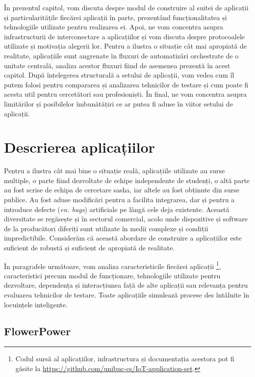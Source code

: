 În prezentul capitol, vom discuta despre modul de construire al suitei de aplicații și particularitățile fiecărei aplicații în parte, prezentând funcționalitatea și tehnologiile utilizate pentru realizarea ei. Apoi, ne vom concentra asupra infrastructurii de interconectare a aplicațiilor și vom discuta despre protocoalele utilizate și motivația alegerii lor. Pentru a ilustra o situație cât mai apropiată de realitate, aplicațiile sunt angrenate în fluxuri de automatizări orchestrate de o unitate centrală, analiza acestor fluxuri fiind de asemenea prezentă în acest capitol. După înțelegerea structurală a setului de aplicații, vom vedea cum îl putem folosi pentru compararea și analizarea tehnicilor de testare și cum poate fi acesta util pentru cercetători sau profesioniști. În final, ne vom concentra asupra limitărilor și posibilelor îmbunătățiri ce ar putea fi aduse în viitor setului de aplicații.

\section{Descrierea aplicațiilor}

Pentru a ilustra cât mai bine o situație reală, aplicațiile utilizate au surse multiple, o parte fiind dezvoltate de echipe independente de studenți, o altă parte au fost scrise de echipa de cercetare \acrshort{sasha}, iar altele au fost obținute din surse publice. Au fost aduse modificări pentru a facilita integrarea, dar și pentru a introduce defecte (\textit{en. bugs}) artificiale pe lângă cele deja existente. Această diversitate se regăsește și în sectorul comercial, acolo unde dispozitive și software de la producători diferiți sunt utilizate în medii complexe și condiții impredictibile. Considerăm că această abordare de construire a aplicațiilor este suficient de robustă și suficient de apropiată de realitate.

În paragrafele următoare, vom analiza caracteristicile fiecărei aplicații \footnote{Codul sursă al aplicațiilor, infrastructura și documentația acestora pot fi găsite la \url{https://github.com/unibuc-cs/IoT-application-set}.}, caracteristici precum modul de funcționare, tehnologiile utilizate pentru dezvoltare, dependența și interacțiunea față de alte aplicații sau relevanța pentru evaluarea tehnicilor de testare. Toate aplicațiile simulează procese des întâlnite în locuințele inteligente.

\subsection*{FlowerPower}


